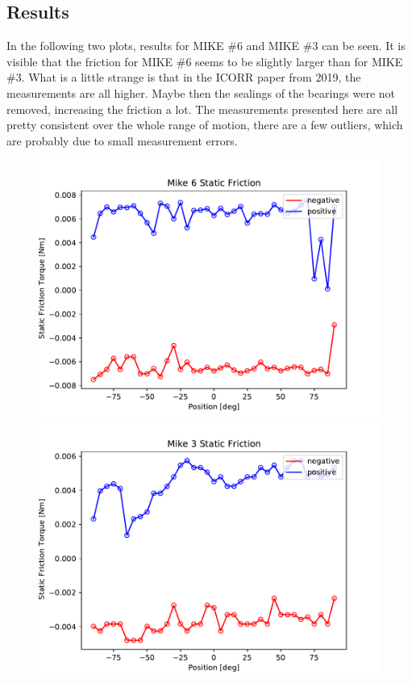 \subsection{Results}

In the following two plots, results for MIKE \#6 and MIKE \#3 can be seen. It is visible that the friction for MIKE \#6 seems to be slightly larger than for MIKE \#3. What is a little strange is that in the ICORR paper from 2019, the measurements are all higher. Maybe then the sealings of the bearings were not removed, increasing the friction a lot. The measurements presented here are all pretty consistent over the whole range of motion, there are a few outliers, which are probably due to small measurement errors.

\begin{figure}[h]
    \begin{minipage}[m]{0.48\textwidth}
     \centering
        \includegraphics[width = \textwidth]{chapters/static friction/Mike6_StaticFriction.pdf}
    \end{minipage}
    \hfill
    \begin{minipage}[m]{0.48\textwidth}
     \centering
        \includegraphics[width = \textwidth]{chapters/static friction/Mike3_StaticFriction.pdf}

\end{minipage}
\end{figure}

